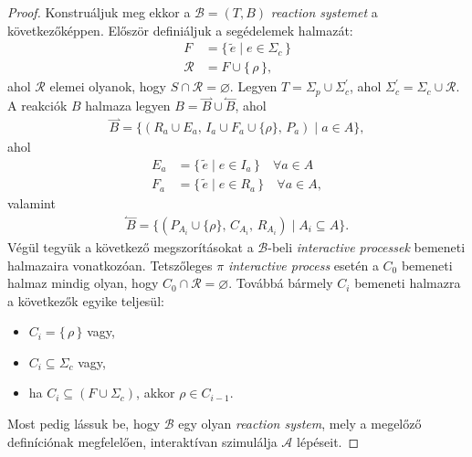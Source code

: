 \documentclass[12pt]{article}
\theoremstyle{definition}
\theoremstyle{remark}
\theoremstyle{plain}
\theoremstyle{plain}
\let\emptyset\varnothing
\newcommand{\forwardhat}{\overset{\rightharpoonup}}
\newcommand{\backwardhat}{\overset{\leftharpoonup}}
\newcommand{\reaction}[3]{
    (#1, \, #2, \, #3)
}
\begin{document}
\begin{proof}
        Konstruáljuk meg ekkor a $\mathscr{B} = (T, B)$ \textit{reaction systemet} a következőképpen. Először definiáljuk a segédelemek halmazát:
        \begin{align*}
            F &= \{ \, \tilde{e} \;|\; e \in \Sigma_{c} \, \} \\
            \mathcal{R} &= F \cup \{ \, \rho \, \},
        \end{align*}
        ahol $\mathcal{R}$ elemei olyanok, hogy $S \cap \mathcal{R} = \emptyset$.
        Legyen $T = \Sigma_{p} \cup \Sigma^{\prime}_{c}$, ahol $\Sigma^{\prime}_{c} = \Sigma_{c} \cup \mathcal{R}$. A reakciók $B$ halmaza legyen $B = \forwardhat B \cup \backwardhat B$, ahol
        \begin{align*}
            \forwardhat B = \{ \reaction{R_{a} \cup E_{a}}{I_{a} \cup F_{a}  \cup \{ \rho \}}{P_{a}} \;|\; a \in A \},
        \end{align*}
        ahol
        \begin{align*}
            E_{a} &= \{ \, \tilde{e} \;|\; e \in I_{a} \, \} \quad \forall a \in A \\
            F_{a} &= \{ \, \tilde{e} \;|\; e \in R_{a} \, \} \quad \forall a \in A,
        \end{align*}
        valamint
        \begin{align*}
            \backwardhat B = \{ \reaction{P_{A_{i}} \cup \{ \rho \}}{C_{A_{i}}}{R_{A_{i}}} \;|\; A_{i} \subseteq A \}.
        \end{align*}
        Végül tegyük a következő megszorításokat a $\mathscr{B}$-beli \textit{interactive processek} bemeneti halmazaira vonatkozóan. Tetszőleges $\pi$ \textit{interactive process} esetén a $C_{0}$ bemeneti halmaz mindig olyan, hogy $C_{0} \cap \mathcal{R} = \emptyset$. Továbbá bármely $C_{i}$ bemeneti halmazra a következők egyike teljesül:
        \begin{itemize}
            \item    
            $C_{i} = \{\, \rho \,\}$ vagy,
            \item
            $C_{i} \subseteq \Sigma_{c}$ vagy,
            \item
            ha $C_{i} \subseteq (F \cup \Sigma_{c})$, akkor $\rho \in C_{i - 1}$.
        \end{itemize}

        Most pedig lássuk be, hogy $\mathscr{B}$ egy olyan \textit{reaction system}, mely a megelőző definíciónak megfelelően, interaktívan szimulálja $\mathscr{A}$ lépéseit.


\end{proof}
\end{document}
